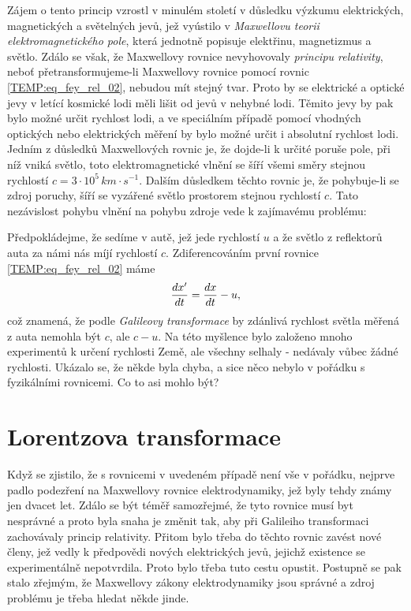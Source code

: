     Zájem o tento princip vzrostl v minulém století v důsledku výzkumu elektrických, magnetických a 
    světelných jevů, jež vyústilo v \emph{Maxwellovu teorii elektromagnetického pole}, která 
    jednotně popisuje elektřinu, magnetizmus a světlo. Zdálo se však, že Maxwellovy rovnice 
    nevyhovovaly \emph{principu relativity}, neboť přetransformujeme-li Maxwellovy rovnice pomocí 
    rovnic \ref{TEMP:eq_fey_rel_02}, nebudou mít stejný tvar. Proto by se elektrické a optické jevy 
    v letící kosmické lodi měli lišit od jevů v nehybné lodi. Těmito jevy by pak bylo možné určit 
    rychlost lodi, a ve speciálním případě pomocí vhodných optických nebo elektrických měření by 
    bylo možné určit i absolutní rychlost lodi. Jedním z důsledků Maxwellových rovnic je, že 
    dojde-li k určité poruše pole, při níž vniká světlo, toto elektromagnetické vlnění se šíří všemi 
    směry stejnou rychlostí $c = 3\cdot10^5\,km\cdot s^{-1}$. Dalším důsledkem těchto rovnic je, že 
    pohybuje-li se zdroj poruchy, šíří se vyzářené světlo prostorem stejnou rychlostí $c$. Tato 
    nezávislost pohybu vlnění na pohybu zdroje vede k zajímavému problému:
    
    Předpokládejme, že sedíme v autě, jež jede rychlostí $u$ a že světlo z reflektorů auta za námi 
    nás míjí rychlostí $c$. Zdiferencováním první rovnice \ref{TEMP:eq_fey_rel_02} máme
    \begin{equation}\label{TEMP:eq_fey_rel_03}
      \frac{d x'}{d t} =\frac{d x}{d t} - u, 
    \end{equation}       
    což znamená, že podle \emph{Galileovy transformace} by zdánlivá rychlost světla měřená z auta 
    nemohla být $c$, ale $c-u$. Na této myšlence bylo založeno mnoho experimentů k určení rychlosti 
    Země, ale všechny selhaly - nedávaly vůbec žádné rychlosti. Ukázalo se, že někde byla chyba, a 
    sice něco nebylo v pořádku s fyzikálními rovnicemi. Co to asi mohlo být?

  \section{Lorentzova transformace}
    Když se zjistilo, že s rovnicemi v uvedeném případě není vše v pořádku, nejprve padlo podezření 
    na Maxwellovy rovnice elektrodynamiky, jež byly tehdy známy jen dvacet let. Zdálo se být téměř 
    samozřejmé, že tyto rovnice musí byt nesprávné a proto byla snaha je změnit tak, aby při 
    Galileiho transformaci zachovávaly princip relativity. Přitom bylo třeba do těchto rovnic zavést 
    nové členy, jež vedly k předpovědi nových elektrických jevů, jejichž existence se experimentálně 
    nepotvrdila. Proto bylo třeba tuto cestu opustit. Postupně se pak stalo zřejmým, že Maxwellovy 
    zákony elektrodynamiky jsou správné a zdroj problému je třeba hledat někde jinde.  
    
